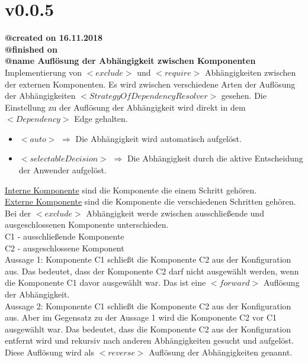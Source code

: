 \documentclass{article}
\begin{document}
\section{v0.0.5}

\noindent \textbf{@created on 16.11.2018}\\
\textbf{@finished on} \\
\textbf{@name Auflösung der Abhängigkeit zwischen Komponenten}\\

\noindent Implementierung von $<exclude>$ und $<require>$ Abhängigkeiten zwischen der externen Komponenten.
Es wird zwischen verschiedene Arten der Auflösung der Abhängigkeiten $<StrategyOfDependencyResolver>$ gesehen.
Die Einstellung zu der Auflösung der Abhängigkeit wird direkt in dem $<Dependency>$ Edge gehalten.

\begin{itemize}
    \item $<auto>$ $\Rightarrow$ Die Abhängigkeit wird automatisch aufgelöst.
    \item $<selectableDecision>$ $\Rightarrow$ Die Abhängigkeit durch 
    die aktive Entscheidung der Anwender aufgelöst. 
\end{itemize}

\noindent\underline{Interne Komponente} sind die Komponente die einem Schritt gehören.\\
\underline{Externe Komponente} sind die Komponente die verschiedenen Schritten gehören.\\

\noindent Bei der $<exclude>$ Abhängigkeit werde zwischen ausschließende und ausgeschlossenen 
Komponente unterschieden.\\
C1 - ausschließende Komponente\\
C2 - ausgeschlossene Komponent\\

Aussage 1: Komponente C1 schließt die Komponente C2 aus der Konfiguration aus. Das bedeutet, dass
der Komponente C2 darf nicht ausgewählt werden, wenn die Komponente C1 davor ausgewählt war. Das ist 
eine $<forward>$ Auflösung der Abhängigkeit.\\

Aussage 2: Komponente C1 schließt die Komponente C2 aus der Konfiguration aus. 
Aber im Gegensatz zu der Aussage 1 wird die Komponente C2 vor C1 ausgewählt war. Das bedeutet, 
dass die Komponente C2 aus der Konfiguration entfernt wird und rekursiv nach 
anderen Abhängigkeiten gesucht und aufgelöst. Diese Auflösung wird als $<reverse>$ Auflösung 
der Abhängigkeiten genannt.\\\\
\end{document}
